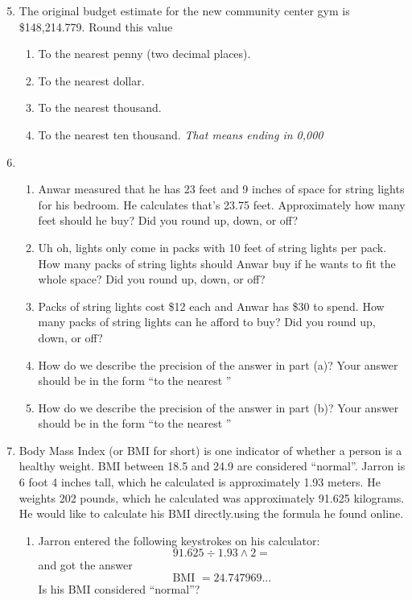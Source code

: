 \begin{enumerate} 
\setcounter{enumi}{4}

\item The original budget estimate for the new community center gym is  \$148,214.779. Round this value 
\begin{enumerate}
\item To the nearest penny (two decimal places).
\item To the nearest dollar.
\item To the nearest thousand.
\item To the nearest ten thousand.  \emph{That means ending in 0,000}
\end{enumerate}

\item \begin{enumerate}
\item  Anwar measured that he has 23 feet and 9 inches of space for string lights for his bedroom.  He calculates that's 23.75 feet.  Approximately how many feet should he buy?  Did you round up, down, or off?
\item Uh oh, lights only come in packs with 10 feet of string lights per pack.  How many packs of string lights should Anwar buy if he wants to fit the whole space?  Did you round up, down, or off?
\item Packs of string lights cost \$12 each and Anwar has \$30 to spend.  How many packs of string lights can he afford to buy?  Did you round up, down, or off?
\item How do we describe the precision of the answer in part (a)?  Your answer should be in the form ``to the nearest \underline{\hspace{1in}}''
\item How do we describe the precision of the answer in part (b)?  Your answer should be in the form ``to the nearest \underline{\hspace{1in}}''
\end{enumerate}

\item Body Mass Index (or BMI for short) is one indicator of whether a person is a healthy weight.  BMI between 18.5 and 24.9 are considered ``normal''.  Jarron is 6 foot 4 inches tall, which he calculated is approximately 1.93 meters.  He weights 202 pounds, which he calculated was approximately 91.625 kilograms. He would like to calculate his BMI directly.using the formula he found online.
\begin{enumerate}
\item Jarron entered the following keystrokes on his calculator: $$91.625 \div 1.93 \wedge 2=$$
and got the answer $$\text{BMI } = 24.747969...$$ Is his BMI considered ``normal''?


\end{enumerate}
\end{enumerate}
